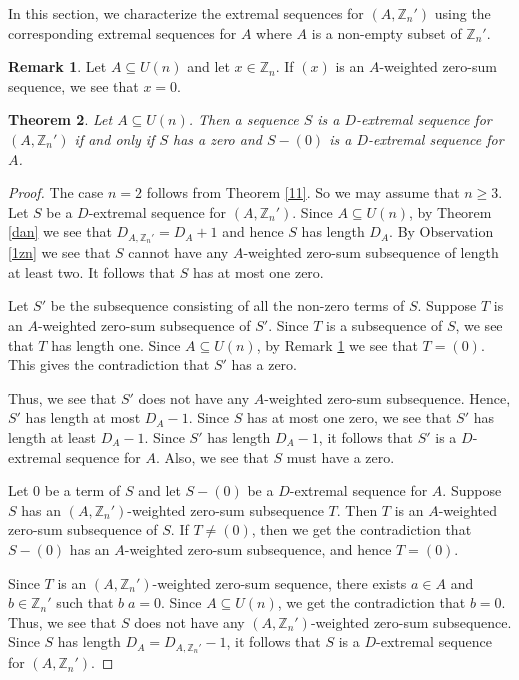 \documentclass{article}[11pt]
\newtheorem{theorem}{Theorem}[section]
\theoremstyle{definition}
\newtheorem{remark}[theorem]{Remark}
\begin{document}
In this section, we characterize the extremal sequences for $(A,\mathbb Z_n')$ using the corresponding extremal sequences for $A$ where $A$ is a non-empty subset of $\mathbb Z_n'$.

\begin{remark}\label{zun}
Let $A\subseteq U(n)$ and let $x\in \mathbb Z_n$. If $(x)$ is an $A$-weighted zero-sum sequence, we see that $x=0$.
\end{remark}

\begin{theorem}\label{da'}
Let $A\subseteq U(n)$. Then a sequence $S$ is a $D$-extremal sequence for $(A,\mathbb Z_n')$ if and only if $S$ has a zero and $S-(0)$ is a $D$-extremal sequence for $A$.
\end{theorem}

\begin{proof}
The case $n=2$ follows from Theorem \ref{11}. So we may assume that $n\geq 3$.
Let $S$ be a $D$-extremal sequence for $(A,\mathbb Z_n')$. Since $A\subseteq U(n)$, by Theorem \ref{dan} we see that $D_{A,\mathbb Z_n'}=D_A+1$ and hence $S$ has length $D_A$. By Observation \ref{1zn} we see that $S$ cannot have any $A$-weighted zero-sum subsequence of length at least two. It follows that $S$ has at most one zero.

Let $S'$ be the subsequence consisting of all the non-zero terms of $S$. Suppose $T$ is an $A$-weighted zero-sum subsequence of $S'$. Since $T$ is a subsequence of $S$, we see that $T$ has length one. Since $A\subseteq U(n)$, by Remark \ref{zun} we see that $T=(0)$. This gives the contradiction that $S'$ has a zero.

Thus, we see that $S'$ does not have any $A$-weighted zero-sum subsequence. Hence, $S'$ has length at most $D_A-1$. Since $S$ has at most one zero, we see that $S'$ has length at least $D_A-1$. Since $S'$ has length $D_A-1$, it follows that $S'$ is a $D$-extremal sequence for $A$. Also, we see that $S$ must have a zero.

Let $0$ be a term of $S$ and let $S-(0)$ be a $D$-extremal sequence for $A$. Suppose $S$ has an $(A,\mathbb Z_n')$-weighted zero-sum subsequence $T$. Then $T$ is an $A$-weighted zero-sum subsequence of $S$. If $T\neq (0)$, then we get the contradiction that $S-(0)$ has an $A$-weighted zero-sum subsequence, and hence $T=(0)$.

Since $T$ is an $(A,\mathbb Z_n')$-weighted zero-sum sequence, there exists $a\in A$ and $b\in \mathbb Z_n'$ such that $b\;a=0$. Since $A\subseteq U(n)$, we get the contradiction that $b=0$. Thus, we see that $S$ does not have any $(A,\mathbb Z_n')$-weighted zero-sum subsequence. Since $S$ has length $D_A=D_{A,\mathbb Z_n'}-1$, it follows that $S$ is a $D$-extremal sequence for $(A,\mathbb Z_n')$.
\end{proof}
\end{document}
